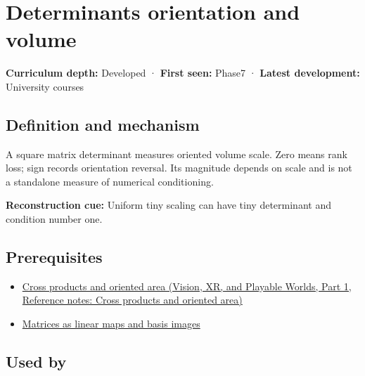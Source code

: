 \hypertarget{appendix-da478be01d02}{}\label{referencestart:appendix-da478be01d02}
\section{Determinants orientation and volume}\label{appendix-da478be01d02-determinants-orientation-and-volume}

\hypertarget{appendix-da478be01d02-determinants-orientation-and-volume}{}

\textbf{Curriculum depth:} Developed · \textbf{First seen:} Phase7 · \textbf{Latest development:} University courses

\begin{allmightroledefinition}

\subsection{Definition and mechanism}\label{appendix-da478be01d02-definition-and-mechanism}

\hypertarget{appendix-da478be01d02-definition-and-mechanism}{}

A square matrix determinant measures oriented volume scale. Zero means rank loss; sign records orientation reversal. Its magnitude depends on scale and is not a standalone measure of numerical conditioning.

\end{allmightroledefinition}

\textbf{Reconstruction cue:} Uniform tiny scaling can have tiny determinant and condition number one.

\subsection{Prerequisites}\label{appendix-da478be01d02-prerequisites}

\hypertarget{appendix-da478be01d02-prerequisites}{}

\begin{itemize}
\tightlist
\item
  \href{../07-Vision-XR-and-Playable-Worlds-P01/main.pdf\#appendix-2391db8052b1}{Cross products and oriented area (Vision, XR, and Playable Worlds, Part 1, Reference notes: Cross products and oriented area)}
\item
  \hyperref[appendix-bd39c3bf5d64]{Matrices as linear maps and basis images}
\end{itemize}

\subsection{Used by}\label{appendix-da478be01d02-used-by}

